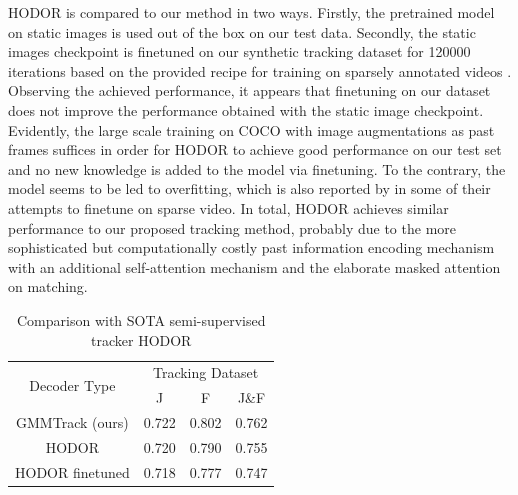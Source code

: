 HODOR is compared to our method in two ways. Firstly, the pretrained model on static images is used out of the box on our test data. Secondly, the static images checkpoint is finetuned on our synthetic tracking dataset for 120000 iterations based on the provided recipe for training on sparsely annotated videos \parencite{HODORgithub}. Observing the achieved performance, it appears that finetuning on our dataset does not improve the performance obtained with the static image checkpoint. Evidently, the large scale training on COCO with image augmentations as past frames suffices in order for HODOR to achieve good performance on our test set and no new knowledge is added to the model via finetuning. To the contrary, the model seems to be led to overfitting, which is also reported by  \cite{athar2022hodor} in some of their attempts to finetune on sparse video. In total, HODOR achieves similar performance to our proposed tracking method, probably due to the more sophisticated but computationally costly past information encoding mechanism with an additional self-attention mechanism and the elaborate masked attention on matching. \par 



 

\begin{table}[ht!]
\caption{Comparison with SOTA semi-supervised tracker HODOR}
\centering
\begin{tabular}{|c|ccc|}
\hline
\multicolumn{1}{|c|}{\multirow{2}{*}{Decoder Type}} & \multicolumn{3}{c|}{Tracking Dataset}                                                                                                   \\ \cline{2-4} 
\multicolumn{1}{|c|}{}                              & \multicolumn{1}{c|}{J} & \multicolumn{1}{c|}{F} & \multicolumn{1}{c|}{J\&F} \\ \hline

GMMTrack (ours)   & 0.722  & 0.802 & 0.762 \\  %
HODOR         & 0.720  & 0.790  & 0.755  \\ %

HODOR finetuned   & 0.718   & 0.777  & 0.747  \\ \hline

\end{tabular}
\end{table}

